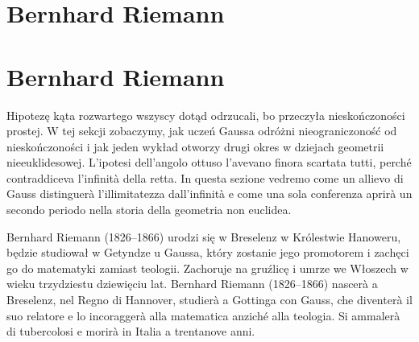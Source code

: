 \section{Bernhard Riemann} %
\section{Bernhard Riemann} %
\label{sekcja_riemann}

Hipotezę kąta rozwartego wszyscy dotąd odrzucali, bo przeczyła nieskończoności prostej. %
W tej sekcji zobaczymy, jak uczeń Gaussa odróżni nieograniczoność od nieskończoności i jak jeden wykład otworzy drugi okres w dziejach geometrii nieeuklidesowej. %
L'ipotesi dell'angolo ottuso l'avevano finora scartata tutti, perché contraddiceva l'infinità della retta. %
In questa sezione vedremo come un allievo di Gauss distinguerà l'illimitatezza dall'infinità e come una sola conferenza aprirà un secondo periodo nella storia della geometria non euclidea. %

Bernhard Riemann (1826--1866) urodzi się w Breselenz w Królestwie Hanoweru, będzie studiował w Getyndze u Gaussa, który zostanie jego promotorem i zachęci go do matematyki zamiast teologii. %
Zachoruje na gruźlicę i umrze we Włoszech w wieku trzydziestu dziewięciu lat. %
Bernhard Riemann (1826--1866) nascerà a Breselenz, nel Regno di Hannover, studierà a Gottinga con Gauss, che diventerà il suo relatore e lo incoraggerà alla matematica anziché alla teologia. %
Si ammalerà di tubercolosi e morirà in Italia a trentanove anni. %
%

